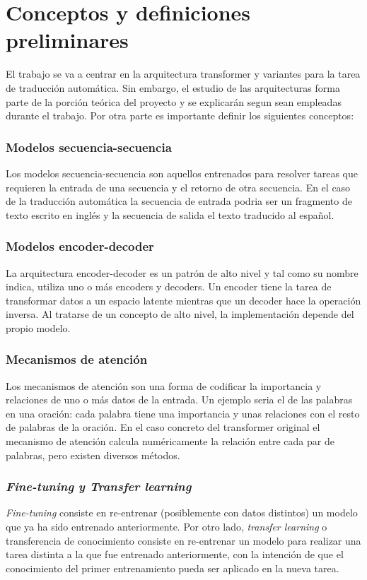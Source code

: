 \section{Conceptos y definiciones preliminares}
El trabajo se va a centrar en la arquitectura transformer \cite{Vaswani2017Jun} y variantes 
para la tarea de traducción automática. Sin embargo, el estudio de las arquitecturas
forma parte de la porción teórica del proyecto y se explicarán segun sean empleadas durante el trabajo.
Por otra parte es importante definir los siguientes conceptos:

\subsubsection{Modelos secuencia-secuencia}
Los modelos secuencia-secuencia son aquellos entrenados para
resolver tareas que requieren la entrada de una secuencia y el retorno de
otra secuencia.
En el caso de la traducción automática la secuencia de entrada podria ser
un fragmento de texto escrito en inglés y la secuencia de salida el texto
traducido al español.

\subsubsection{Modelos encoder-decoder}
La arquitectura encoder-decoder es un patrón de alto nivel y tal como su nombre indica,
utiliza uno o más encoders y decoders.
Un encoder tiene la tarea de transformar datos a un espacio latente
mientras que un decoder hace la operación inversa. Al tratarse de un concepto de alto nivel, la
implementación depende del propio modelo.

\subsubsection{Mecanismos de atención}
Los mecanismos de atención son una forma de codificar la importancia y relaciones de uno o más
datos de la entrada. Un ejemplo seria el de las palabras en una oración: cada palabra tiene una
importancia y unas relaciones con el resto de palabras de la oración.
En el caso concreto del transformer original \cite{Vaswani2017Jun} el mecanismo de atención
calcula numéricamente la relación entre cada par de palabras, pero existen diversos métodos.

\subsubsection{\textit{Fine-tuning y Transfer learning}}
\textit{Fine-tuning} consiste en re-entrenar (posiblemente con datos distintos) un modelo que ya ha
sido entrenado anteriormente. Por otro lado, \textit{transfer learning} o transferencia de conocimiento
consiste en re-entrenar un modelo para realizar una tarea distinta a la que fue entrenado anteriormente,
con la intención de que el conocimiento del primer entrenamiento pueda ser aplicado en la nueva tarea.

